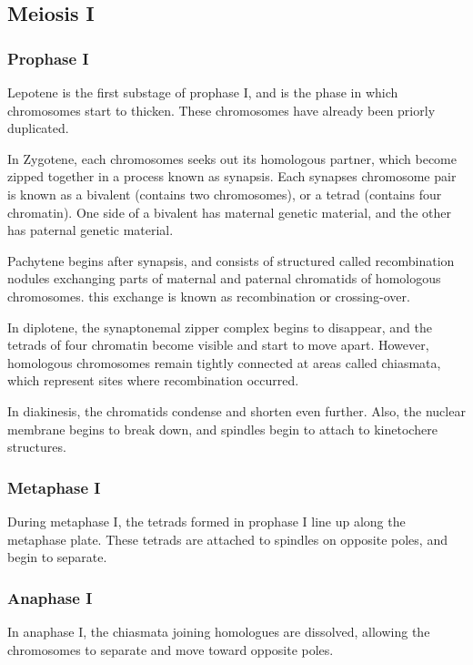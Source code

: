 \documentclass[12pt,titlepage]{article}
\begin{document}
      \subsection{Meiosis I}

        \subsubsection{Prophase I}
          Lepotene is the first substage of prophase I, and is the phase in which chromosomes start to thicken. These chromosomes have already been priorly duplicated.

          In Zygotene, each chromosomes seeks out its homologous partner, which become zipped together in a process known as synapsis. Each synapses chromosome pair is known
          as a bivalent (contains two chromosomes), or a tetrad (contains four chromatin). One side of a bivalent has maternal genetic material, and the other has paternal
          genetic material.

          Pachytene begins after synapsis, and consists of structured called recombination nodules exchanging parts of maternal and paternal chromatids of homologous chromosomes.
          this exchange is known as recombination or crossing-over.

          In diplotene, the synaptonemal zipper complex begins to disappear, and the tetrads of four chromatin become visible and start to move apart. However, homologous
          chromosomes remain tightly connected at areas called chiasmata, which represent sites where recombination occurred.

          In diakinesis, the chromatids condense and shorten even further. Also, the nuclear membrane begins to break down, and spindles begin to attach to kinetochere structures.

        \subsubsection{Metaphase I}
          During metaphase I, the tetrads formed in prophase I line up along the metaphase plate. These tetrads are attached to spindles on opposite poles, and begin to separate.

        \subsubsection{Anaphase I}
          In anaphase I, the chiasmata joining homologues are dissolved, allowing the chromosomes to separate and move toward opposite poles.
\end{document}
